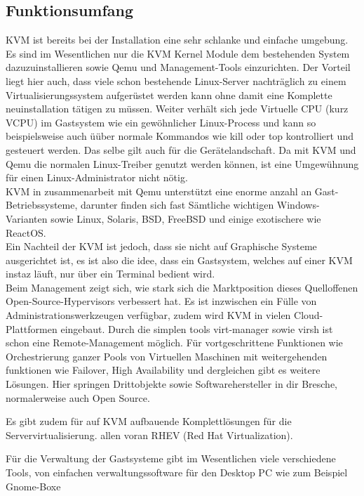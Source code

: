 \documentclass[14pt]{extreport}
\begin{document}
\subsection{Funktionsumfang}
KVM ist bereits bei der Installation eine sehr schlanke und einfache umgebung. 
Es sind im Wesentlichen nur die KVM Kernel Module dem bestehenden System dazuzuinstallieren sowie Qemu und Management-Tools einzurichten. Der Vorteil liegt hier auch, dass viele schon bestehende Linux-Server nachträglich zu einem Virtualisierungssystem aufgerüstet werden kann ohne damit eine Komplette neuinstallation tätigen zu müssen.
Weiter verhält sich jede  Virtuelle CPU (kurz VCPU) im Gastsystem wie ein gewöhnlicher Linux-Process und kann so beispielsweise auch üüber normale Kommandos wie kill oder top kontrolliert und gesteuert werden. Das selbe gilt auch für die Gerätelandschaft. Da mit KVM und Qemu die normalen Linux-Treiber genutzt werden können, ist eine Umgewühnung für einen Linux-Administrator nicht nötig.\\

KVM in zusammenarbeit mit Qemu unterstützt eine enorme anzahl an Gast-Betriebssysteme, darunter finden sich fast Sämtliche wichtigen Windows-Varianten sowie Linux, Solaris, BSD, FreeBSD und einige exotischere wie ReactOS.\\

Ein Nachteil der KVM ist jedoch, dass sie nicht auf Graphische Systeme ausgerichtet ist, es ist also die idee, dass ein Gastsystem, welches auf einer KVM instaz läuft, nur über ein Terminal bedient wird.\\
Beim Management zeigt sich, wie stark sich die Marktposition dieses Quelloffenen Open-Source-Hypervisors verbessert hat. Es ist inzwischen ein Fülle von Administrationswerkzeugen verfügbar, zudem wird KVM in vielen Cloud-Plattformen eingebaut.
Durch die simplen tools virt-manager sowie virsh ist schon eine Remote-Management möglich. Für vortgeschrittene Funktionen wie Orchestrierung ganzer Pools von Virtuellen Maschinen mit weitergehenden funktionen wie Failover, High Availability und dergleichen gibt es weitere Lösungen. Hier springen Drittobjekte sowie Softwarehersteller in dir Bresche, normalerweise auch Open Source. 

Es gibt zudem für auf KVM aufbauende Komplettlösungen für die Servervirtualisierung. allen voran RHEV (Red Hat Virtualization).
 
Für die Verwaltung der Gastsysteme gibt im Wesentlichen viele verschiedene Tools, von einfachen verwaltungssoftware für den Desktop PC wie zum Beispiel Gnome-Boxe
\end{document}
